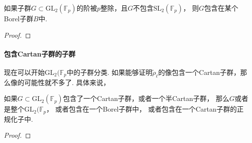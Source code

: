 \begin{cprop}
    如果子群$G\subset \mathrm{GL}_2(\mathbb{F}_p)$的阶被$p$整除，且$G$不包含$\mathrm{SL}_2(\mathbb{F}_p)$，
    则$G$包含在某个Borel子群$B$中.
\end{cprop}

\begin{proof}
\end{proof}

\paragraph{包含Cartan子群的子群}

现在可以开始$\mathrm{GL}_2(\mathbb{F}_p$中的子群分类.
如果能够证明$\tilde{\rho}_{\ell}$的像包含一个Cartan子群，那么像的可能性就不多了.
具体来说，
\begin{cprop}
    如果$G\subset \mathrm{GL}_2(\mathbb{F}_p)$包含了一个Cartan子群，或者一个半Cartan子群，
    那么$G$或者是整个$ \mathrm{GL}_2(\mathbb{F}_p$，
    或者包含在一个Borel子群中，
    或者包含在一个Cartan子群的正规化子中.
\end{cprop}

\begin{proof}
\end{proof}
